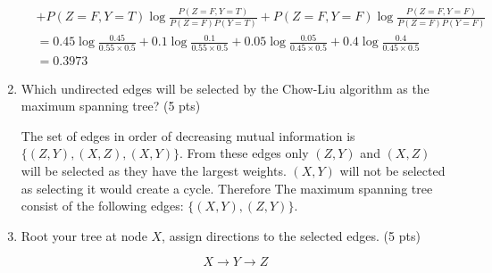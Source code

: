 \documentclass[a4paper]{article}
\theoremstyle{definition}
\newenvironment{soln}{
	\leavevmode\color{blue}\ignorespaces
}{}
\begin{document}
\begin{enumerate}
\begin{soln}
\begin{align*}
				&+ P(Z=F, Y=T) \log \frac{P(Z=F, Y=T)}{P(Z=F)P(Y=T)} + P(Z=F, Y=F) \log \frac{P(Z=F, Y=F)}{P(Z=F)P(Y=F)} \\
				&= 0.45 \log \frac{0.45}{0.55 \times 0.5} + 0.1 \log \frac{0.1}{0.55 \times 0.5} + 0.05 \log \frac{0.05}{0.45 \times 0.5} + 0.4 \log \frac{0.4}{0.45 \times 0.5} \\
				&= 0.3973
			\end{align*}
		\end{soln}
	\item Which undirected edges will be selected by the Chow-Liu algorithm as the maximum spanning tree? (5 pts)
		\begin{soln}
			The set of edges in order of decreasing mutual information is $\{(Z, Y), (X, Z), (X, Y)\}$. From these edges only $(Z,Y)$ and $(X,Z)$ will be selected as they have the largest weights. $(X,Y)$ will not be selected as selecting it would create a cycle. Therefore The maximum spanning tree consist of the following edges: $\{(X, Y), (Z, Y)\}$.
		\end{soln}
	\item Root your tree at node $X$, assign directions to the selected edges. (5 pts)
	
	\begin{soln}
		$$X \rightarrow Y \rightarrow Z$$
	\end{soln}
\end{enumerate}

	
	
\end{document}
